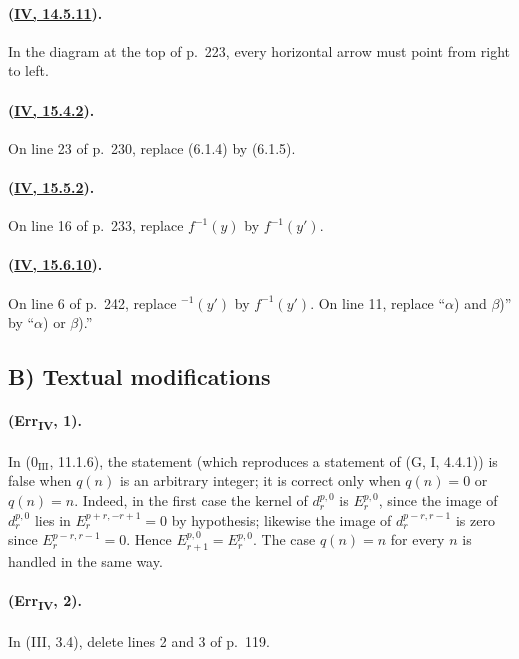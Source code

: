 \paragraph{({\texorpdfstring{\protect\hyperref[IV.14.5.11]{IV, 14.5.11}}{IV, 14.5.11}}).}
In the diagram at the top of p.~223, every horizontal arrow must point
from right to left.

\paragraph{({\texorpdfstring{\protect\hyperref[IV.15.4.2]{IV, 15.4.2}}{IV, 15.4.2}}).}
On line 23 of p.~230, replace (6.1.4) by (6.1.5).

\paragraph{({\texorpdfstring{\protect\hyperref[IV.15.5.2]{IV, 15.5.2}}{IV, 15.5.2}}).}
On line 16 of p.~233, replace $f^{-1}(y)$ by $f^{-1}(y')$.

\paragraph{({\texorpdfstring{\protect\hyperref[IV.15.6.10]{IV, 15.6.10}}{IV, 15.6.10}}).}
On line 6 of p.~242, replace ${}^{-1}(y')$ by $f^{-1}(y')$.  On line
11, replace ``$\alpha$) and $\beta$)'' by ``$\alpha$) or $\beta$).''

\subsection*{B) Textual modifications}

\paragraph{(Err\textsubscript{IV}, 1).}
In ($0_{\mathrm{III}}$, 11.1.6), the statement (which reproduces a
statement of (G, I, 4.4.1)) is false when $q(n)$ is an arbitrary integer;
it is correct only when $q(n)=0$ or $q(n)=n$.  Indeed, in the first case
the kernel of $d_r^{p,0}$ is $E_r^{p,0}$, since the image of
$d_r^{p,0}$ lies in $E_r^{p+r,-r+1}=0$ by hypothesis; likewise the
image of $d_r^{p-r,r-1}$ is zero since $E_r^{p-r,r-1}=0$.  Hence
$E_{r+1}^{p,0}=E_r^{p,0}$.  The case $q(n)=n$ for every $n$ is handled
in the same way.

\paragraph{(Err\textsubscript{IV}, 2).}
In (III, 3.4), delete lines 2 and 3 of p.~119.

